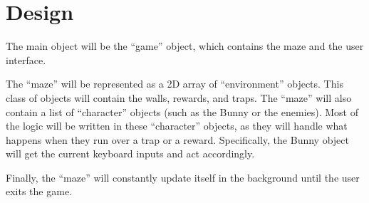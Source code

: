 \documentclass{article}
\begin{document}
\section{Design}

The main object will be the ``game'' object, which contains the maze and the
user interface.

The ``maze'' will be represented as a 2D array of ``environment'' objects.
This class of objects will contain the walls, rewards, and traps.
The ``maze'' will also contain a list of ``character'' objects (such as the
Bunny or the enemies).
Most of the logic will be written in these ``character'' objects, as they will
handle what happens when they run over a trap or a reward.
Specifically, the Bunny object will get the current keyboard inputs and act
accordingly.

Finally, the ``maze'' will constantly update itself in the background until the
user exits the game.
\end{document}
